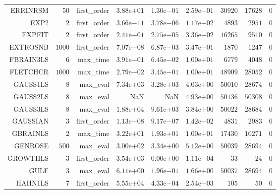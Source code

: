 \begin{longtable}{rrrrrrrrr}
ERRINRSM & \(    50\) & first\_order & \( 3.88\)e\(+01\) & \( 1.30\)e\(-01\) & \( 2.59\)e\(-01\) & \( 30920\) & \( 17628\) & \(     0\) \\
EXP2 & \(     2\) & first\_order & \( 3.66\)e\(-11\) & \( 3.78\)e\(-06\) & \( 1.17\)e\(-02\) & \(  4893\) & \(  2951\) & \(     0\) \\
EXPFIT & \(     2\) & first\_order & \( 2.41\)e\(-01\) & \( 2.75\)e\(-05\) & \( 3.36\)e\(-02\) & \( 16265\) & \(  9510\) & \(     0\) \\
EXTROSNB & \(  1000\) & first\_order & \( 7.07\)e\(-08\) & \( 6.87\)e\(-03\) & \( 3.47\)e\(-01\) & \(  1870\) & \(  1247\) & \(     0\) \\
FBRAIN3LS & \(     6\) & max\_time & \( 3.91\)e\(-01\) & \( 6.45\)e\(-02\) & \( 1.00\)e\(+01\) & \(  6779\) & \(  4048\) & \(     0\) \\
FLETCHCR & \(  1000\) & max\_time & \( 2.79\)e\(-02\) & \( 3.45\)e\(-01\) & \( 1.00\)e\(+01\) & \( 48909\) & \( 28052\) & \(     0\) \\
GAUSS1LS & \(     8\) & max\_eval & \( 7.34\)e\(+03\) & \( 3.28\)e\(+03\) & \( 4.03\)e\(+00\) & \( 50010\) & \( 28674\) & \(     0\) \\
GAUSS2LS & \(     8\) & max\_eval &       NaN &       NaN & \( 4.93\)e\(+00\) & \( 50136\) & \( 50308\) & \(     0\) \\
GAUSS3LS & \(     8\) & max\_eval & \( 1.88\)e\(+04\) & \( 9.61\)e\(+03\) & \( 3.84\)e\(+00\) & \( 50022\) & \( 28684\) & \(     0\) \\
GAUSSIAN & \(     3\) & first\_order & \( 1.13\)e\(-08\) & \( 9.17\)e\(-07\) & \( 1.42\)e\(-02\) & \(  4831\) & \(  2983\) & \(     0\) \\
GBRAINLS & \(     2\) & max\_time & \( 3.22\)e\(+01\) & \( 1.93\)e\(+01\) & \( 1.00\)e\(+01\) & \( 17430\) & \( 10271\) & \(     0\) \\
GENROSE & \(   500\) & max\_eval & \( 3.00\)e\(+02\) & \( 3.34\)e\(+00\) & \( 5.12\)e\(+00\) & \( 50039\) & \( 28694\) & \(     0\) \\
GROWTHLS & \(     3\) & first\_order & \( 3.54\)e\(+03\) & \( 0.00\)e\(+00\) & \( 1.11\)e\(-04\) & \(    33\) & \(    24\) & \(     0\) \\
GULF & \(     3\) & max\_eval & \( 6.11\)e\(+00\) & \( 1.96\)e\(-01\) & \( 1.66\)e\(+00\) & \( 50037\) & \( 28694\) & \(     0\) \\
HAHN1LS & \(     7\) & first\_order & \( 5.55\)e\(+04\) & \( 4.33\)e\(-04\) & \( 2.54\)e\(-03\) & \(   105\) & \(    50\) & \(     0\) \\

\end{longtable}
